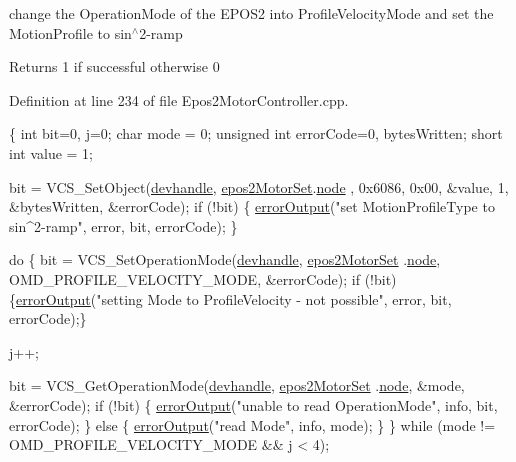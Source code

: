 change the Operation\-Mode of the E\-P\-O\-S2 into Profile\-Velocity\-Mode and set the Motion\-Profile to sin$^\wedge$2-\/ramp 

\begin{DoxyReturn}{Returns}
1 if successful otherwise 0 
\end{DoxyReturn}


Definition at line 234 of file Epos2\-Motor\-Controller.\-cpp.


\begin{DoxyCode}
\{
    \textcolor{keywordtype}{int} bit=0, j=0;
    \textcolor{keywordtype}{char} mode = 0;
    \textcolor{keywordtype}{unsigned} \textcolor{keywordtype}{int} errorCode=0, bytesWritten;
    \textcolor{keywordtype}{short} \textcolor{keywordtype}{int} value = 1;

    bit = VCS\_SetObject(\hyperlink{classEpos2MotorController_a40594faab444bcba221ab9d55d1162cd}{devhandle}, \hyperlink{classEpos2MotorController_a0856f5fdd71ffa3b84a536afa085bfb1}{epos2MotorSet}.\hyperlink{structEpos2MotorController_1_1epos2Settings_ab8f18d3df17e8de9ed5250a3e53292c6}{node}
      , 0x6086, 0x00, &value, 1, &bytesWritten, &errorCode);
    \textcolor{keywordflow}{if} (!bit) \{
        \hyperlink{classEpos2MotorController_a64d5e3e3858597c111e60ba8b382a63b}{errorOutput}(\textcolor{stringliteral}{"set MotionProfileType to sin^2-ramp"}, error, 
      bit, errorCode);
    \}

    \textcolor{keywordflow}{do} \{
        bit = VCS\_SetOperationMode(\hyperlink{classEpos2MotorController_a40594faab444bcba221ab9d55d1162cd}{devhandle}, \hyperlink{classEpos2MotorController_a0856f5fdd71ffa3b84a536afa085bfb1}{epos2MotorSet}
      .\hyperlink{structEpos2MotorController_1_1epos2Settings_ab8f18d3df17e8de9ed5250a3e53292c6}{node}, OMD\_PROFILE\_VELOCITY\_MODE, &errorCode);
        \textcolor{keywordflow}{if} (!bit) \{\hyperlink{classEpos2MotorController_a64d5e3e3858597c111e60ba8b382a63b}{errorOutput}(\textcolor{stringliteral}{"setting Mode to ProfileVelocity -
       not possible"}, error, bit, errorCode);\}

        j++;

        bit = VCS\_GetOperationMode(\hyperlink{classEpos2MotorController_a40594faab444bcba221ab9d55d1162cd}{devhandle}, \hyperlink{classEpos2MotorController_a0856f5fdd71ffa3b84a536afa085bfb1}{epos2MotorSet}
      .\hyperlink{structEpos2MotorController_1_1epos2Settings_ab8f18d3df17e8de9ed5250a3e53292c6}{node}, &mode, &errorCode);
        \textcolor{keywordflow}{if} (!bit) \{
            \hyperlink{classEpos2MotorController_a64d5e3e3858597c111e60ba8b382a63b}{errorOutput}(\textcolor{stringliteral}{"unable to read OperationMode"}, info, bit, 
      errorCode);
        \} \textcolor{keywordflow}{else} \{
            \hyperlink{classEpos2MotorController_a64d5e3e3858597c111e60ba8b382a63b}{errorOutput}(\textcolor{stringliteral}{"read Mode"}, info, mode);
        \}
    \} \textcolor{keywordflow}{while} (mode != OMD\_PROFILE\_VELOCITY\_MODE && j < 4);


\end{DoxyCode}
